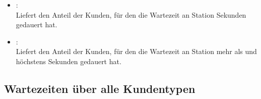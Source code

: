 \begin{itemize}
\item
{}:\\
Liefert den Anteil der Kunden, für den die Wartezeit an Station   Sekunden gedauert hat.

\item
{}:\\
Liefert den Anteil der Kunden, für den die Wartezeit an Station  mehr als  und höchstens  Sekunden gedauert hat.

\end{itemize}



\subsection{Wartezeiten über alle Kundentypen}
  
